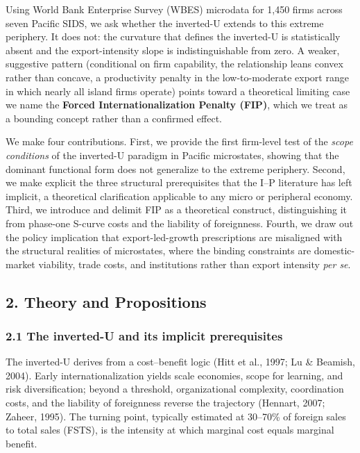 \documentclass[
  12pt,a4paper]{article}
\begin{document}
Using World Bank Enterprise Survey (WBES) microdata for 1,450 firms
across seven Pacific SIDS, we ask whether the inverted-U extends to this
extreme periphery. It does not: the curvature that defines the
inverted-U is statistically absent and the export-intensity slope is
indistinguishable from zero. A weaker, suggestive pattern (conditional
on firm capability, the relationship leans convex rather than concave, a
productivity penalty in the low-to-moderate export range in which nearly
all island firms operate) points toward a theoretical limiting case we
name the \textbf{Forced Internationalization Penalty (FIP)}, which we
treat as a bounding concept rather than a confirmed effect.

We make four contributions. First, we provide the first firm-level test
of the \emph{scope conditions} of the inverted-U paradigm in Pacific
microstates, showing that the dominant functional form does not
generalize to the extreme periphery. Second, we make explicit the three
structural prerequisites that the I--P literature has left implicit, a
theoretical clarification applicable to any micro or peripheral economy.
Third, we introduce and delimit FIP as a theoretical construct,
distinguishing it from phase-one S-curve costs and the liability of
foreignness. Fourth, we draw out the policy implication that
export-led-growth prescriptions are misaligned with the structural
realities of microstates, where the binding constraints are
domestic-market viability, trade costs, and institutions rather than
export intensity \emph{per se}.

\hypertarget{theory-and-propositions}{%
\subsection{2. Theory and Propositions}\label{theory-and-propositions}}

\hypertarget{the-inverted-u-and-its-implicit-prerequisites}{%
\subsubsection{2.1 The inverted-U and its implicit
prerequisites}\label{the-inverted-u-and-its-implicit-prerequisites}}

The inverted-U derives from a cost--benefit logic (Hitt et al., 1997; Lu
\& Beamish, 2004). Early internationalization yields scale economies,
scope for learning, and risk diversification; beyond a threshold,
organizational complexity, coordination costs, and the liability of
foreignness reverse the trajectory (Hennart, 2007; Zaheer, 1995). The
turning point, typically estimated at 30--70\% of foreign sales to
total sales (FSTS), is the intensity at which marginal cost equals
marginal benefit.
\end{document}
